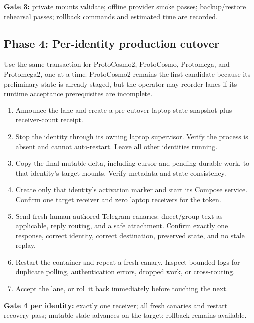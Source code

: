 \documentclass[11pt]{article}
\begin{document}
\textbf{Gate 3:} private mounts validate; offline provider smoke passes;
backup/restore rehearsal passes; rollback commands and estimated time are
recorded.

\subsection*{Phase 4: Per-identity production cutover}

Use the same transaction for ProtoCosmo2, ProtoCosmo, Protomega, and
Protomega2, one at a time. ProtoCosmo2 remains the first candidate because its
preliminary state is already staged, but the operator may reorder lanes if its
runtime acceptance prerequisites are incomplete.

\begin{enumerate}
\item Announce the lane and create a pre-cutover laptop state snapshot plus
receiver-count receipt.
\item Stop the identity through its owning laptop supervisor. Verify the
process is absent and cannot auto-restart. Leave all other identities running.
\item Copy the final mutable delta, including cursor and pending durable work,
to that identity's target mounts. Verify metadata and state consistency.
\item Create only that identity's activation marker and start its Compose
service. Confirm one target receiver and zero laptop receivers for the token.
\item Send fresh human-authored Telegram canaries: direct/group text as
applicable, reply routing, and a safe attachment. Confirm exactly one response,
correct identity, correct destination, preserved state, and no stale replay.
\item Restart the container and repeat a fresh canary. Inspect bounded logs for
duplicate polling, authentication errors, dropped work, or cross-routing.
\item Accept the lane, or roll it back immediately before touching the next.
\end{enumerate}

\textbf{Gate 4 per identity:} exactly one receiver; all fresh canaries and
restart recovery pass; mutable state advances on the target; rollback remains
available.
\end{document}
